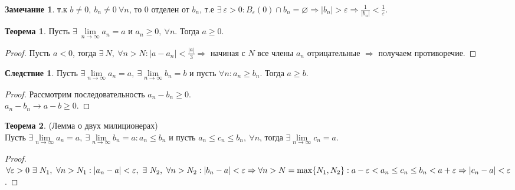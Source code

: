 \documentclass[a4paper, 12pt]{article}
\renewcommand{\epsilon}{\varepsilon}
\renewcommand{\emptyset}{\varnothing}
\newcommand{\lims}{\lim\limits_{n\to \infty}}
\theoremstyle{definition}
\newtheorem*{theorem}{Теорема}
\newtheorem*{consequense}{Следствие}
\newtheorem*{comm}{Замечание}
\begin{document}
        \begin{comm}
            т.к $b\ne 0,\ b_n\ne 0\ \forall n$, то 0 отделен от $b_n$, т.е $\exists\ \epsilon>0: B_{\epsilon}(0)\cap b_n=\emptyset \Rightarrow |b_n|>\epsilon \Rightarrow \frac{1}{|b_n|}<\frac{1}{\epsilon}$.
        \end{comm}
        \begin{theorem}
            Пусть $\exists\ \lim\limits_{n\to \infty} a_n=a$ и $a_n\geq 0,\ \forall n$. Тогда $a\geq 0$.
        \end{theorem} 
        \begin{proof}
            Пусть $a<0$, тогда $\exists\ N,\ \forall n>N: |a-a_n|<\frac{|a|}{3} \Rightarrow$ начиная с $N$ все члены $a_n$ отрицательные $\Rightarrow$ получаем противоречие.
        \end{proof} 
        \begin{consequense}
            Пусть $\exists \lims a_n =a,\ \exists \lims b_n=b$ и пусть $\forall n: a_n\geq b_n$. Тогда $a\geq b$.
        \end{consequense}  
        \begin{proof}
            Рассмотрим последовательность $a_n-b_n\geq 0$.\\ $a_n-b_n\to a-b\geq 0$.
        \end{proof} 
        \begin{theorem} (Лемма о двух милиционерах)\\
            Пусть $\exists \lims a_n =a,\ \exists \lims b_n=a: a_n\leq b_n$ и пусть $a_n\leq c_n\leq b_n,\ \forall n$, тогда $\exists \lims c_n=a$.
        \end{theorem} 
        \begin{proof}
            $\forall \epsilon>0\ \exists\ N_1,\ \forall n>N_1: |a_n-a|<\epsilon,\ \exists\ N_2,\ \forall n>N_2:\\
            |b_n-a|<\epsilon \Rightarrow \forall n > N=\max\{N_1,N_2\}: a-\epsilon < a_n\leq c_n \leq b_n < a+\epsilon\\
            \Rightarrow |c_n-a|<\epsilon$.
        \end{proof}
\end{document}
